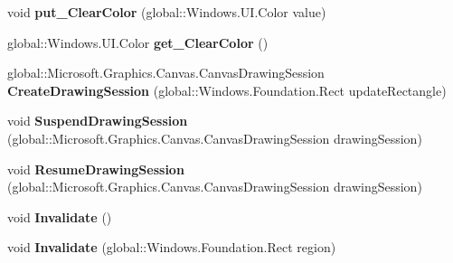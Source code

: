 \begin{DoxyCompactItemize}
void {\bfseries put\+\_\+\+Clear\+Color} (global\+::\+Windows.\+U\+I.\+Color value)
\item 
\mbox{\label{class_microsoft_1_1_graphics_1_1_canvas_1_1_u_i_1_1_xaml_1_1_canvas_virtual_control_ad85b4cdd55249b068fd5faca1d6a7339}} 
global\+::\+Windows.\+U\+I.\+Color {\bfseries get\+\_\+\+Clear\+Color} ()
\item 
\mbox{\label{class_microsoft_1_1_graphics_1_1_canvas_1_1_u_i_1_1_xaml_1_1_canvas_virtual_control_afd788b24472d49a5bfc528818f1b2897}} 
global\+::\+Microsoft.\+Graphics.\+Canvas.\+Canvas\+Drawing\+Session {\bfseries Create\+Drawing\+Session} (global\+::\+Windows.\+Foundation.\+Rect update\+Rectangle)
\item 
\mbox{\label{class_microsoft_1_1_graphics_1_1_canvas_1_1_u_i_1_1_xaml_1_1_canvas_virtual_control_a67b34bbbcf4601ef850f26c26a0c3f54}} 
void {\bfseries Suspend\+Drawing\+Session} (global\+::\+Microsoft.\+Graphics.\+Canvas.\+Canvas\+Drawing\+Session drawing\+Session)
\item 
\mbox{\label{class_microsoft_1_1_graphics_1_1_canvas_1_1_u_i_1_1_xaml_1_1_canvas_virtual_control_a48ffbfafcaa20c4de29aee9bdec37dbd}} 
void {\bfseries Resume\+Drawing\+Session} (global\+::\+Microsoft.\+Graphics.\+Canvas.\+Canvas\+Drawing\+Session drawing\+Session)
\item 
\mbox{\label{class_microsoft_1_1_graphics_1_1_canvas_1_1_u_i_1_1_xaml_1_1_canvas_virtual_control_a091af64be3106bd03ef97245d58c8ef1}} 
void {\bfseries Invalidate} ()
\item 
\mbox{\label{class_microsoft_1_1_graphics_1_1_canvas_1_1_u_i_1_1_xaml_1_1_canvas_virtual_control_a14ac18c62a4e58078a3df49c2bd61e7d}} 
void {\bfseries Invalidate} (global\+::\+Windows.\+Foundation.\+Rect region)
\item 

\end{DoxyCompactItemize}
